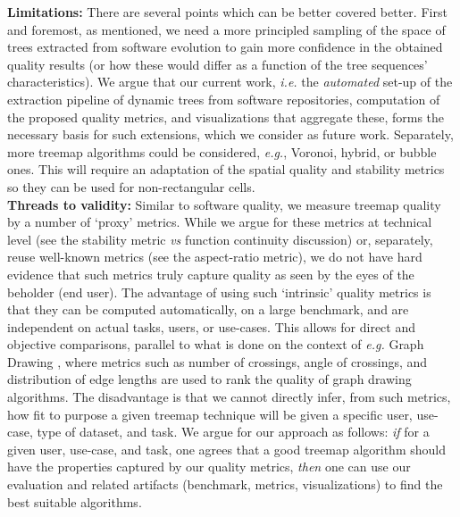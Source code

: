 \noindent\textbf{Limitations:} There are several points which can be better covered better. First and foremost, as mentioned, we need a more principled sampling of the space of trees extracted from software evolution to gain more confidence in the obtained quality results (or how these would differ as a function of the tree sequences' characteristics). We argue that our current work, \emph{i.e.} the \emph{automated} set-up of the extraction pipeline of dynamic trees from software repositories, computation of the proposed quality metrics, and visualizations that aggregate these, forms the necessary basis for such extensions, which we consider as future work. Separately, more treemap algorithms could be considered, \emph{e.g.}, Voronoi, hybrid, or bubble ones. This will require an adaptation of the spatial quality and stability metrics so they can be used for non-rectangular cells.\\

\noindent\textbf{Threads to validity:} Similar to software quality, we measure treemap quality by a number of `proxy' metrics. While we argue for these metrics at technical level (see the stability metric \emph{vs} function continuity discussion) or, separately, reuse well-known metrics (see the aspect-ratio metric), we do not have hard evidence that such metrics truly capture quality as seen by the eyes of the beholder (end user). The advantage of using such `intrinsic' quality metrics is that they can be computed automatically, on a large benchmark, and are independent on actual tasks, users, or use-cases. This allows for direct and objective comparisons, parallel to what is done on the context of \emph{e.g.}  Graph Drawing \citep{hachul,battista}, where metrics such as number of crossings, angle of crossings, and distribution of edge lengths are used to rank the quality of graph drawing algorithms. 
The disadvantage is that we cannot directly infer, from such metrics, how fit to purpose a given treemap technique will be given a specific user, use-case, type of dataset, and task. We argue for our approach as follows: \emph{if} for a given user, use-case, and task, one agrees that a good treemap algorithm should have the properties captured by our quality metrics, \emph{then} one can use our evaluation and related artifacts (benchmark, metrics, visualizations) to find the best suitable algorithms.



